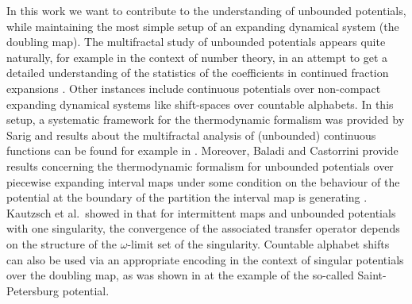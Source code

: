 \documentclass[11pt,reqno]{amsart}
\theoremstyle{plain}
\theoremstyle{definition}
\begin{document}
In this work we want to contribute to the understanding of unbounded potentials, while maintaining the most simple setup of an expanding dynamical system (the doubling map). The multifractal study of unbounded potentials appears quite naturally, for example in the context of number theory, in an attempt to get a detailed understanding of the statistics of the coefficients in continued fraction expansions \cite{FLWW09}. Other instances include continuous potentials over non-compact expanding dynamical systems like shift-spaces over countable alphabets. In this setup, a systematic framework for the thermodynamic formalism was provided by Sarig \cite{Sarig99} and results about the multifractal analysis of (unbounded) continuous functions can be found for example in \cite{IJ15}.
Moreover, Baladi and Castorrini provide results concerning the thermodynamic formalism for unbounded potentials over piecewise expanding interval maps under some condition on the behaviour of the potential at the boundary of the partition the interval map is generating \cite{BalCas}. Kautzsch et al.\ showed in \cite{KKS16} that for intermittent maps and unbounded potentials with one singularity,  the convergence of the associated transfer operator depends on the   structure of  the $\omega$-limit set of the singularity.
Countable alphabet shifts can also be used via an appropriate encoding in the context of singular potentials over the doubling map, as was shown in \cite{KLRW19} at the example of the so-called Saint-Petersburg potential.
\end{document}
